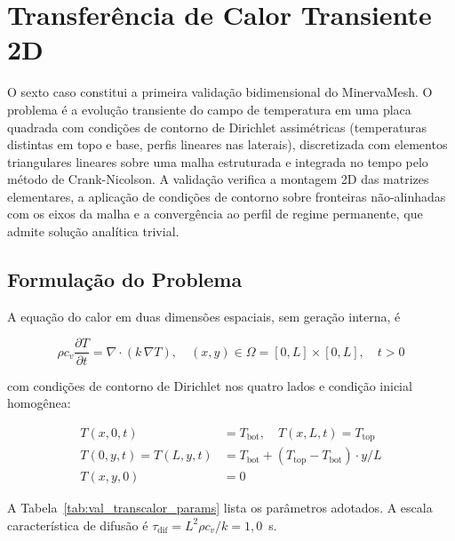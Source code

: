 
\section{Transferência de Calor Transiente 2D}
\label{sec:val_transcalor}

O sexto caso constitui a primeira validação bidimensional do MinervaMesh. O problema é a evolução transiente do campo de temperatura em uma placa quadrada com condições de contorno de Dirichlet assimétricas (temperaturas distintas em topo e base, perfis lineares nas laterais), discretizada com elementos triangulares lineares sobre uma malha estruturada e integrada no tempo pelo método de Crank-Nicolson. A validação verifica a montagem 2D das matrizes elementares, a aplicação de condições de contorno sobre fronteiras não-alinhadas com os eixos da malha e a convergência ao perfil de regime permanente, que admite solução analítica trivial.

\subsection{Formulação do Problema}

A equação do calor em duas dimensões espaciais, sem geração interna, é

\begin{equation}
    \rho c_v \frac{\partial T}{\partial t} = \nabla \cdot \left( k \, \nabla T \right), \quad (x,y) \in \Omega = [0, L] \times [0, L], \quad t > 0
    \label{eq:val_transcalor_edp}
\end{equation}

\noindent com condições de contorno de Dirichlet nos quatro lados e condição inicial homogênea:

\begin{equation}
\begin{aligned}
    T(x, 0, t) &= T_{\mathrm{bot}}, \quad T(x, L, t) = T_{\mathrm{top}} \\
    T(0, y, t) = T(L, y, t) &= T_{\mathrm{bot}} + (T_{\mathrm{top}} - T_{\mathrm{bot}}) \cdot y / L \\
    T(x, y, 0) &= 0
\end{aligned}
    \label{eq:val_transcalor_cc}
\end{equation}

A Tabela~\ref{tab:val_transcalor_params} lista os parâmetros adotados. A escala característica de difusão é $\tau_{\mathrm{dif}} = L^2 \rho c_v / k = 1{,}0$~s.


